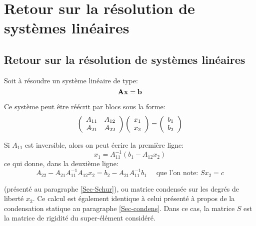 \medskip
\ifVersionAvecExemplesSepares
   \section{Retour sur la résolution de systèmes linéaires}
\else
   \subsection{Retour sur la résolution de systèmes linéaires}
\fi

Soit à résoudre un système linéaire de type:
\begin{equation}\label{Eq-lin} \mathbf{A}\mathbf{x}=\mathbf{b} \end{equation}

Ce système peut être réécrit par blocs sous la forme:
\begin{equation} 
\left( \begin{array}{cc} A_{11} & A_{12}\\ A_{21} & A_{22} \end{array}\right)
\left( \begin{array}{c} x_1 \\ x_2 \end{array}\right) =
\left( \begin{array}{c} b_1\\ b_2 \end{array}\right) 
\end{equation}

\medskip
Si $A_{11}$ est inversible, alors on peut écrire la première ligne:
\begin{equation}
x_1 = A_{11}^{-1}\left( b_1-A_{12}x_2 \right)
\end{equation}
ce qui donne, dans la deuxième ligne:
\begin{equation}
A_{22} - A_{21}A_{11}^{-1}A_{12}x_2 = b_2 - A_{21}A_{11}^{-1}b_1
\quad \text{ que l'on note: }
S x_2=c
\end{equation}

(présenté au paragraphe \ref{Sec-Schur}), ou matrice condensée sur les degrés de liberté $x_2$.
Ce calcul est également identique à celui présenté à propos de la condensation statique au paragraphe \ref{Sec-condens}.
Dans ce cas, la matrice $S$ est la matrice de rigidité du super-élément considéré.

